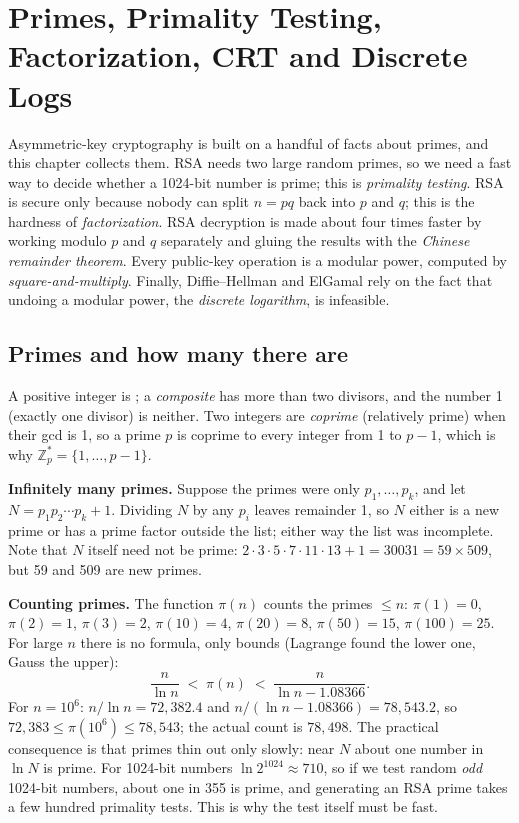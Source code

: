 \section{Primes, Primality Testing, Factorization, CRT and Discrete Logs}\label{sec:primes}

Asymmetric-key cryptography is built on a handful of facts about primes, and this chapter collects them. RSA needs two large random primes, so we need a fast way to decide whether a 1024-bit number is prime; this is \emph{primality testing}. RSA is secure only because nobody can split $n = pq$ back into $p$ and $q$; this is the hardness of \emph{factorization}. RSA decryption is made about four times faster by working modulo $p$ and $q$ separately and gluing the results with the \emph{Chinese remainder theorem}. Every public-key operation is a modular power, computed by \emph{square-and-multiply}. Finally, Diffie--Hellman and ElGamal rely on the fact that undoing a modular power, the \emph{discrete logarithm}, is infeasible.

\subsection{Primes and how many there are}
A positive integer is ; a \emph{composite} has more than two divisors, and the number 1 (exactly one divisor) is neither. Two integers are \emph{coprime} (relatively prime) when their gcd is 1, so a prime $p$ is coprime to every integer from 1 to $p - 1$, which is why $\mathbb{Z}_p^* = \{1, \dots, p - 1\}$.

\textbf{Infinitely many primes.} Suppose the primes were only $p_1, \dots, p_k$, and let $N = p_1 p_2 \cdots p_k + 1$. Dividing $N$ by any $p_i$ leaves remainder 1, so $N$ either is a new prime or has a prime factor outside the list; either way the list was incomplete. Note that $N$ itself need not be prime: $2 \cdot 3 \cdot 5 \cdot 7 \cdot 11 \cdot 13 + 1 = 30031 = 59 \times 509$, but 59 and 509 are new primes.

\textbf{Counting primes.} The function $\pi(n)$ counts the primes $\le n$: $\pi(1) = 0$, $\pi(2) = 1$, $\pi(3) = 2$, $\pi(10) = 4$, $\pi(20) = 8$, $\pi(50) = 15$, $\pi(100) = 25$. For large $n$ there is no formula, only bounds (Lagrange found the lower one, Gauss the upper):
\[
\frac{n}{\ln n} \;<\; \pi(n) \;<\; \frac{n}{\ln n - 1.08366}.
\]
For $n = 10^6$: $n/\ln n = 72{,}382.4$ and $n/(\ln n - 1.08366) = 78{,}543.2$, so $72{,}383 \le \pi(10^6) \le 78{,}543$; the actual count is $78{,}498$. The practical consequence is that primes thin out only slowly: near $N$ about one number in $\ln N$ is prime. For 1024-bit numbers $\ln 2^{1024} \approx 710$, so if we test random \emph{odd} 1024-bit numbers, about one in 355 is prime, and generating an RSA prime takes a few hundred primality tests. This is why the test itself must be fast.

